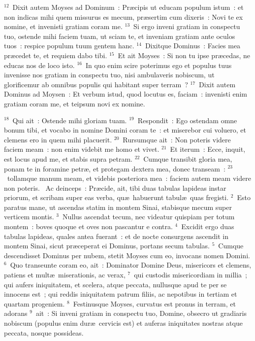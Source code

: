 ${}^{12}$~Dixit autem Moyses ad Dominum~: Pr\ae cipis ut educam populum istum~: et non indicas mihi quem missurus es mecum, pr\ae sertim cum dixeris~: Novi te ex nomine, et invenisti gratiam coram me.
${}^{13}$~Si ergo inveni gratiam in conspectu tuo, ostende mihi faciem tuam, ut sciam te, et inveniam gratiam ante oculos tuos~: respice populum tuum gentem hanc.
${}^{14}$~Dixitque Dominus~: Facies mea pr\ae cedet te, et requiem dabo tibi.
${}^{15}$~Et ait Moyses~: Si non tu ipse pr\ae cedas, ne educas nos de loco isto.
${}^{16}$~In quo enim scire poterimus ego et populus tuus invenisse nos gratiam in conspectu tuo, nisi ambulaveris nobiscum, ut glorificemur ab omnibus populis qui habitant super terram~?
${}^{17}$~Dixit autem Dominus ad Moysen~: Et verbum istud, quod locutus es, faciam~: invenisti enim gratiam coram me, et teipsum novi ex nomine.


${}^{18}$~Qui ait~: Ostende mihi gloriam tuam.
${}^{19}$~Respondit~: Ego ostendam omne bonum tibi, et vocabo in nomine Domini coram te~: et miserebor cui voluero, et clemens ero in quem mihi placuerit.
${}^{20}$~Rursumque ait~: Non poteris videre faciem meam~: non enim videbit me homo et vivet.
${}^{21}$~Et iterum~: Ecce, inquit, est locus apud me, et stabis supra petram.
${}^{22}$~Cumque transibit gloria mea, ponam te in foramine petr\ae , et protegam dextera mea, donec transeam~:
${}^{23}$~tollamque manum meam, et videbis posteriora mea~: faciem autem meam videre non poteris.
~Ac deinceps~: Pr\ae cide, ait, tibi duas tabulas lapideas instar priorum, et scribam super eas verba, qu\ae\ habuerunt tabul\ae\ quas fregisti.
${}^{2}$~Esto paratus mane, ut ascendas statim in montem Sinai, stabisque mecum super verticem montis.
${}^{3}$~Nullus ascendat tecum, nec videatur quispiam per totum montem~: boves quoque et oves non pascantur e contra.
${}^{4}$~Excidit ergo duas tabulas lapideas, quales antea fuerant~: et de nocte consurgens ascendit in montem Sinai, sicut pr\ae ceperat ei Dominus, portans secum tabulas.
${}^{5}$~Cumque descendisset Dominus per nubem, stetit Moyses cum eo, invocans nomen Domini.
${}^{6}$~Quo transeunte coram eo, ait~: Dominator Domine Deus, misericors et clemens, patiens et mult\ae\ miserationis, ac verax,
${}^{7}$~qui custodis misericordiam in millia~; qui aufers iniquitatem, et scelera, atque peccata, nullusque apud te per se innocens est~; qui reddis iniquitatem patrum filiis, ac nepotibus in tertiam et quartam progeniem.
${}^{8}$~Festinusque Moyses, curvatus est pronus in terram, et adorans
${}^{9}$~ait~: Si inveni gratiam in conspectu tuo, Domine, obsecro ut gradiaris nobiscum (populus enim dur\ae\ cervicis est) et auferas iniquitates nostras atque peccata, nosque possideas.


